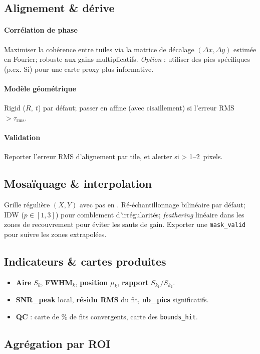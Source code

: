 \subsection{Alignement \& dérive}
\paragraph{Corrélation de phase} Maximiser la cohérence entre tuiles via la matrice de décalage $(\Delta x,\Delta y)$ estimée en Fourier; robuste aux gains multiplicatifs. \emph{Option} : utiliser des pics spécifiques (p.ex. Si) pour une carte proxy plus informative.
\paragraph{Modèle géométrique} Rigid ($R,\ t$) par défaut; passer en affine (avec cisaillement) si l'erreur RMS $> \tau_{\mathrm{rms}}$.
\paragraph{Validation} Reporter l'erreur RMS d'alignement par tile, et alerter si > 1--2~pixels.

\subsection{Mosaïquage \& interpolation}
Grille régulière $(X,Y)$ avec pas en \um. Ré-échantillonnage bilinéaire par défaut; IDW ($p\in[1,3]$) pour comblement d'irrégularités; \emph{feathering} linéaire dans les zones de recouvrement pour éviter les sauts de gain. Exporter une \texttt{mask\_valid} pour suivre les zones extrapolées.

\subsection{Indicateurs \& cartes produites}
\begin{itemize}[nosep]
\item \textbf{Aire} $S_k$, \textbf{FWHM}$_k$, \textbf{position} $\mu_k$, \textbf{rapport} $S_{k_1}/S_{k_2}$.
\item \textbf{SNR\_peak} local, \textbf{résidu RMS} du fit, \textbf{nb\_pics} significatifs.
\item \textbf{QC} : carte de \% de fits convergents, carte des \texttt{bounds\_hit}.
\end{itemize}

\subsection{Agrégation par ROI}
